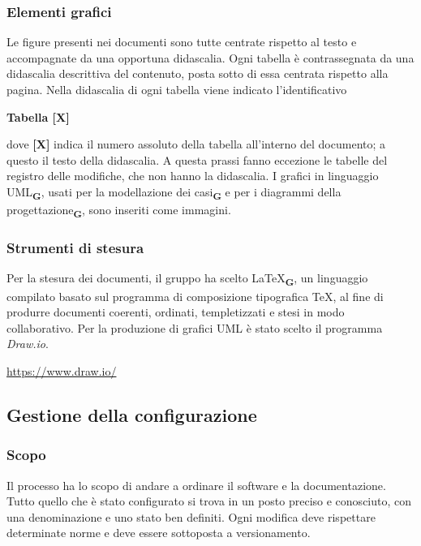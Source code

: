         \subsubsection{Elementi grafici}
            Le figure presenti nei documenti sono tutte centrate rispetto al testo e accompagnate da una opportuna didascalia.
            Ogni tabella è contrassegnata da una didascalia descrittiva del contenuto, posta sotto di essa centrata rispetto alla pagina.  Nella didascalia di ogni tabella viene indicato l’identificativo
            \begin{center}
                \textbf{Tabella [X]}
            \end{center}
            dove \textbf{[X]} indica il numero assoluto della tabella all’interno del documento; a questo il testo della didascalia. A questa prassi fanno eccezione le tabelle del registro delle modifiche, che non hanno la didascalia.
            I grafici in linguaggio UML\textsubscript{\textbf{G}}, usati per la modellazione dei casi\textsubscript{\textbf{G}} e per i diagrammi della progettazione\textsubscript{\textbf{G}}, sono inseriti come immagini.
        \subsubsection{Strumenti di stesura}
            \subsubsubsection{\LaTeX}
            Per la stesura dei documenti, il gruppo ha scelto \LaTeX\textsubscript{\textbf{G}}, un linguaggio compilato basato sul programma di composizione tipografica \TeX, al fine di produrre documenti coerenti, ordinati, templetizzati e stesi in modo collaborativo.
            Per la produzione di grafici UML è stato scelto il programma \textit{Draw.io}.
            \begin{center}
                \href{https://www.draw.io/}{https://www.draw.io/}\\
            \end{center}
    \subsection{Gestione della configurazione}
        \subsubsection{Scopo}
        Il processo ha lo scopo di andare a ordinare il software e la documentazione. Tutto quello che è stato configurato si trova in un posto preciso e conosciuto, con una denominazione e uno stato ben definiti. Ogni modifica deve rispettare determinate norme e deve essere sottoposta a versionamento.
